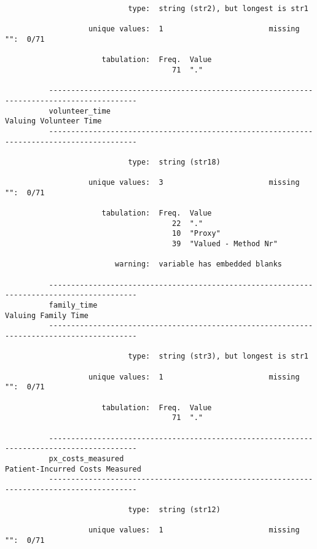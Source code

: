 \documentclass{article}
\begin{document}
\begin{verbatim}
                            type:  string (str2), but longest is str1
          
                   unique values:  1                        missing "":  0/71
          
                      tabulation:  Freq.  Value
                                      71  "."
          
          ------------------------------------------------------------------------------------------
          volunteer_time                                                      Valuing Volunteer Time
          ------------------------------------------------------------------------------------------
          
                            type:  string (str18)
          
                   unique values:  3                        missing "":  0/71
          
                      tabulation:  Freq.  Value
                                      22  "."
                                      10  "Proxy"
                                      39  "Valued - Method Nr"
          
                         warning:  variable has embedded blanks
          
          ------------------------------------------------------------------------------------------
          family_time                                                            Valuing Family Time
          ------------------------------------------------------------------------------------------
          
                            type:  string (str3), but longest is str1
          
                   unique values:  1                        missing "":  0/71
          
                      tabulation:  Freq.  Value
                                      71  "."
          
          ------------------------------------------------------------------------------------------
          px_costs_measured                                          Patient-Incurred Costs Measured
          ------------------------------------------------------------------------------------------
          
                            type:  string (str12)
          
                   unique values:  1                        missing "":  0/71
          

\end{verbatim}
\end{document}
